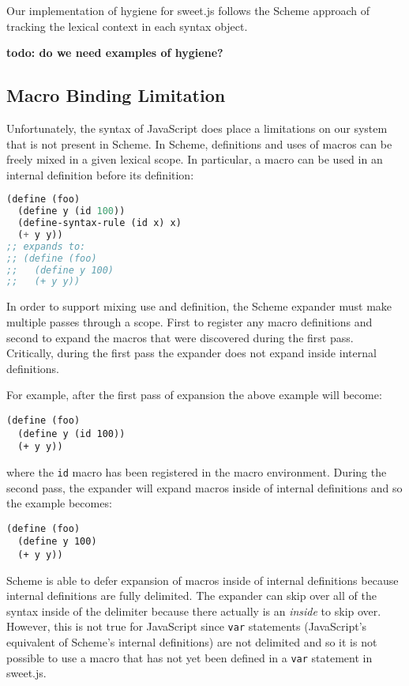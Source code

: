 \documentclass[preprint,10pt]{sigplanconf}
\begin{document}
Our implementation of hygiene for sweet.js follows the Scheme approach
\cite{Hieb1992,Flatt2012} of tracking the lexical context in each
syntax object.

\textbf{todo: do we need examples of hygiene?}

\subsection{Macro Binding Limitation} 
\label{sec:macroBinding}

Unfortunately, the syntax of JavaScript does place a limitations on
our system that is not present in Scheme. In Scheme, definitions and
uses of macros can be freely mixed in a given lexical scope. In
particular, a macro can be used in an internal definition before its definition:

\begin{lstlisting}[language=lisp]
(define (foo)
  (define y (id 100))
  (define-syntax-rule (id x) x)
  (+ y y))
;; expands to:
;; (define (foo)
;;   (define y 100)
;;   (+ y y))
\end{lstlisting}

In order to support mixing use and definition, the Scheme expander
must make multiple passes through a scope. First to register any macro
definitions and second to expand the macros that were discovered
during the first pass. Critically, during the first pass the expander
does not expand inside internal definitions.

For example, after the first pass of expansion the above example will become:
\begin{lstlisting}
(define (foo)
  (define y (id 100))
  (+ y y))
\end{lstlisting}
where the \lstinline!id! macro has been registered in the macro
environment. During the second pass, the expander will expand macros
inside of internal definitions and so the example becomes:
\begin{lstlisting}
(define (foo)
  (define y 100)
  (+ y y))
\end{lstlisting}

Scheme is able to defer expansion of macros inside of internal
definitions because internal definitions are fully delimited. The
expander can skip over all of the syntax inside of the delimiter
because there actually is an \emph{inside} to skip over. However, this
is not true for JavaScript since \lstinline!var! statements
(JavaScript's equivalent of Scheme's internal definitions) are not
delimited and so it is not possible to use a macro that has not yet
been defined in a \lstinline!var! statement in sweet.js.
\end{document}
